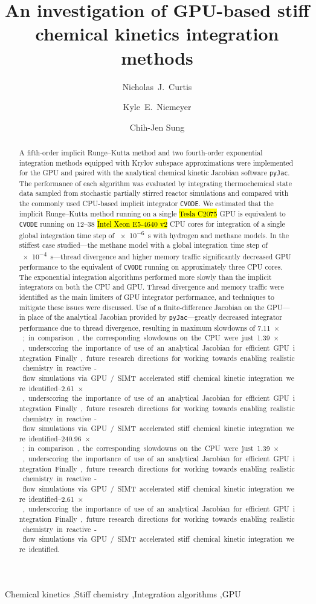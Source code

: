 \documentclass[preprint,review,11pt]{elsarticle}
\DeclareRobustCommand{\hly}[1]{\sethlcolor{yellow}\hl{#1}}
\begin{document}
\begin{frontmatter}

\title{An investigation of GPU-based stiff chemical kinetics integration methods}

\author[uconn]{Nicholas~J.\ Curtis}
\author[osu]{Kyle~E.\ Niemeyer}
\author[uconn]{Chih-Jen Sung}

\address[uconn]{Department of Mechanical Engineering\\
  University of Connecticut, Storrs, CT 06269, USA}
\address[osu]{School of Mechanical, Industrial, and Manufacturing Engineering\\
  Oregon State University, Corvallis, OR 97331, USA}


\begin{abstract}
A fifth-order implicit Runge--Kutta method and two fourth-order exponential integration methods equipped with Krylov subspace approximations were implemented for the GPU and paired with the analytical chemical kinetic Jacobian software \texttt{pyJac}.
The performance of each algorithm was evaluated by integrating thermochemical state data sampled from stochastic partially stirred reactor simulations and compared with the commonly used CPU-based implicit integrator \texttt{CVODE}.
We estimated that the implicit Runge--Kutta method running on a single \hly{Tesla C2075} GPU is equivalent to \texttt{CVODE} running on \numrange{12}{38} \hly{Intel Xeon E5-4640 v2} CPU cores for integration of a single global integration time step of \SI{e-6}{\second} with hydrogen and methane models.
In the stiffest case studied---the methane model with a global integration time step of \SI{e-4}{\second}---thread divergence and higher memory traffic significantly decreased GPU performance to the equivalent of \texttt{CVODE} running on approximately three CPU cores.
The exponential integration algorithms performed more slowly than the implicit integrators on both the CPU and GPU.
Thread divergence and memory traffic were identified as the main limiters of GPU integrator performance, and techniques to mitigate these issues were discussed.
Use of a finite-difference Jacobian on the GPU---in place of the analytical Jacobian provided by \texttt{pyJac}---greatly decreased integrator performance due to thread divergence, resulting in maximum slowdowns of \SIrange{7.11}{240.96}{$\times$}; in comparison, the corresponding slowdowns on the CPU were just \SIrange{1.39}{2.61}{$\times$}, underscoring the importance of use of an analytical Jacobian for efficient GPU integration.
Finally, future research directions for working towards enabling realistic chemistry in reactive-flow simulations via GPU\slash SIMT accelerated stiff chemical kinetic integration were identified.
\end{abstract}

\begin{keyword}
 Chemical kinetics \sep Stiff chemistry \sep Integration algorithms \sep GPU
\end{keyword}

\end{frontmatter}
\end{document}
